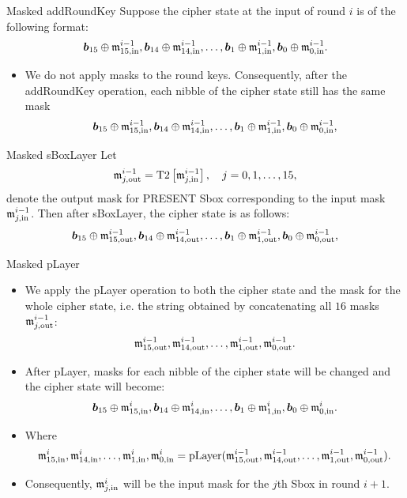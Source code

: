 \begin{frame}{Masked addRoundKey}
Suppose the cipher state at the input of round $i$ is of the following format:
\[
\boldsymbol{b}_{15}\oplus{\mathfrak m}^{i-1}_{15,\text{in}},\boldsymbol{b}_{14}\oplus{\mathfrak m}^{i-1}_{14,\text{in}},\dots,\boldsymbol{b}_1\oplus{\mathfrak m}^{i-1}_{1,\text{in}},\boldsymbol{b}_0\oplus{\mathfrak m}^{i-1}_{0,\text{in}}.
\]
    \begin{itemize}
        \item We do not apply masks to the round keys. 
    Consequently, after the addRoundKey operation, each nibble of the cipher state still has the same mask
\[
\boldsymbol{b}_{15}\oplus{\mathfrak m}^{i-1}_{15,\text{in}},\boldsymbol{b}_{14}\oplus{\mathfrak m}^{i-1}_{14,\text{in}},\dots,\boldsymbol{b}_1\oplus{\mathfrak m}^{i-1}_{1,\text{in}},\boldsymbol{b}_0\oplus{\mathfrak m}^{i-1}_{0,\text{in}},
\]
    \end{itemize}
\end{frame}


\begin{frame}{Masked sBoxLayer}
    Let 
    \[
    {\mathfrak m}^{i-1}_{j,\text{out}}=\text{T2}\left[{\mathfrak m}^{i-1}_{j,\text{in}}\right],\quad j=0,1,\dots,15,
    \]
    denote the output mask for PRESENT Sbox corresponding to the input mask ${\mathfrak m}^{i-1}_{j,\text{in}}$.
    Then after sBoxLayer, the cipher state is as follows:
   \[
\boldsymbol{b}_{15}\oplus{\mathfrak m}^{i-1}_{15,\text{out}},\boldsymbol{b}_{14}\oplus{\mathfrak m}^{i-1}_{14,\text{out}},\dots,\boldsymbol{b}_1\oplus{\mathfrak m}^{i-1}_{1,\text{out}},\boldsymbol{b}_0\oplus{\mathfrak m}^{i-1}_{0,\text{out}},
\] 
\end{frame}

\begin{frame}{Masked pLayer}
    \begin{itemize}
        \item We apply the pLayer operation to both the cipher state and the mask for the whole cipher state, i.e. the string obtained by concatenating all $16$ masks ${\mathfrak m}^{i-1}_{j,\text{out}}$:
     \[
{\mathfrak m}^{i-1}_{15,\text{out}},{\mathfrak m}^{i-1}_{14,\text{out}},\dots,{\mathfrak m}^{i-1}_{1,\text{out}},{\mathfrak m}^{i-1}_{0,\text{out}}.
\] 
\item After pLayer, masks for each nibble of the cipher state will be changed and the cipher state will become:
    \[
\boldsymbol{b}_{15}\oplus{\mathfrak m}^{i}_{15,\text{in}},\boldsymbol{b}_{14}\oplus{\mathfrak m}^{i}_{14,\text{in}},\dots,\boldsymbol{b}_1\oplus{\mathfrak m}^{i}_{1,\text{in}},\boldsymbol{b}_0\oplus{\mathfrak m}^{i}_{0,\text{in}}.
\]
\item Where
\[
{\mathfrak m}^{i}_{15,\text{in}},{\mathfrak m}^{i}_{14,\text{in}},\dots,{\mathfrak m}^{i}_{1,\text{in}},{\mathfrak m}^{i}_{0,\text{in}}=\text{pLayer}({\mathfrak m}^{i-1}_{15,\text{out}},{\mathfrak m}^{i-1}_{14,\text{out}},\dots,{\mathfrak m}^{i-1}_{1,\text{out}},{\mathfrak m}^{i-1}_{0,\text{out}}).
\]
\item Consequently, ${\mathfrak m}^{i}_{j,\text{in}}$ will be the input mask for the $j$th Sbox in round $i+1$.
    \end{itemize}
\end{frame}

